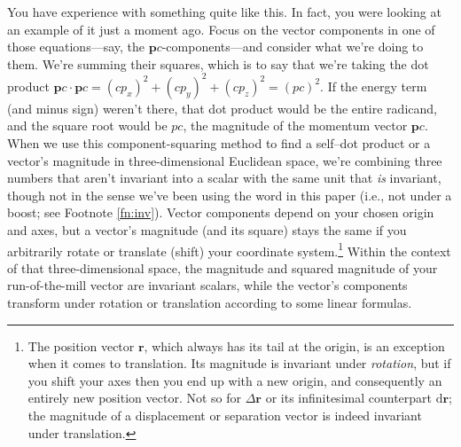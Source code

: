 \documentclass[12pt]{article}
\renewcommand{\vv}[1]{\mathbf{#1}}
\newcommand{\dd}[1]{\mathrm{d}#1}
\begin{document}
You have experience with something quite like this. In fact, you were looking at an example of it just a moment ago. Focus on the vector components in one of those equations---say, the $\vv p c$-components---and consider what we're doing to them. We're summing their squares, which is to say that we're taking the dot product $\vv p c \cdot \vv p c= (cp_x)^2 + (cp_y)^2 + (cp_z)^2 = (p c)^2$. If the energy term (and minus sign) weren't there, that dot product would be the entire radicand, and the square root would be $p c$, the magnitude of the momentum vector $\vv p c$. When we use this component-squaring method to find a self--dot product or a vector's magnitude in three-dimensional Euclidean space, we're combining three numbers that aren't invariant into a scalar with the same unit that \emph{is} invariant, though not in the sense we've been using the word in this paper (i.e., not under a boost; see Footnote \ref{fn:inv}). Vector components depend on your chosen origin and axes, but a vector's magnitude (and its square) stays the same if you arbitrarily rotate or translate (shift) your coordinate system.\footnote{\label{fn:pv}The position vector $\vv r$, which always has its tail at the origin, is an exception when it comes to translation. Its magnitude is invariant under \emph{rotation}, but if you shift your axes then you end up with a new origin, and consequently an entirely new position vector. Not so for $\Delta \vv r$ or its infinitesimal counterpart $\dd \vv r$; the magnitude of a displacement or separation vector is indeed invariant under translation.} Within the context of that three-dimensional space, the magnitude and squared magnitude of your run-of-the-mill vector are invariant scalars, while the vector's components transform under rotation or translation according to some linear formulas.
\end{document}
